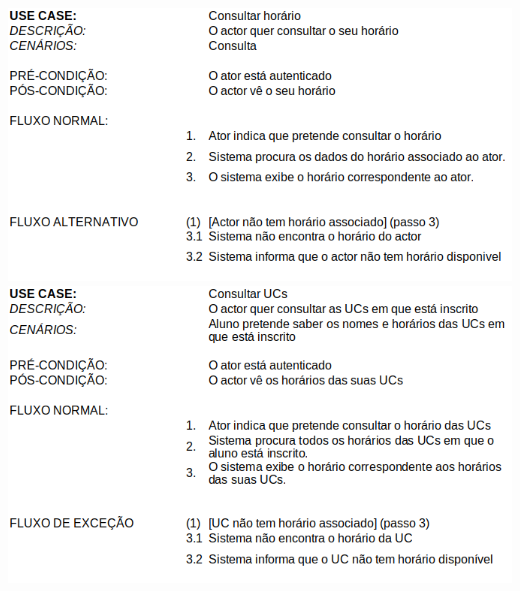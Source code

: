 \documentclass[a4paper,12pt]{article}
\begin{document}
    \includegraphics[width=\textwidth]{consultarHorario.png}\vspace{2cm}
    \includegraphics[width=\textwidth]{consultaUCs.png}
\end{document}
